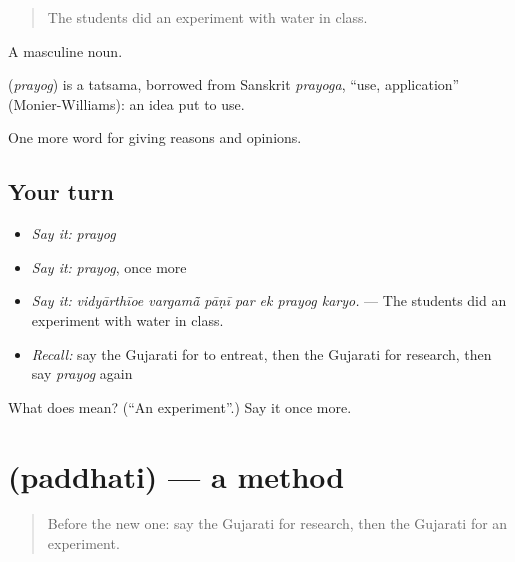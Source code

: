 \begin{quote}
The students did an experiment with water in class.
\end{quote}

A masculine noun.

\begin{cousinweb}
\textbf{} (\emph{prayog}) is a tatsama, borrowed from Sanskrit \emph{prayoga}, \textquotedblleft{}use, application\textquotedblright{} (Monier-Williams): an idea put to use.
\end{cousinweb}

\begin{grammarlens}[title={What you've built}]
One more word for giving reasons and opinions.
\end{grammarlens}

\subsection*{Your turn}
\begin{itemize}
\raggedright
  \item \emph{Say it:} \emph{prayog}
  \item \emph{Say it:} \emph{prayog}, once more
  \item \emph{Say it:} \emph{vidyārthīoe vargamā̃ pāṇī par ek prayog karyo.} — The students did an experiment with water in class.
  \item \emph{Recall:} say the Gujarati for to entreat, then the Gujarati for research, then say \emph{prayog} again
\end{itemize}

\begin{tcolorbox}[breakable,colback=teal!4,colframe=teal!35!black,title={Before you move on}]
What does  mean? (\textquotedblleft{}An experiment\textquotedblright{}.) Say it once more.
\end{tcolorbox}
\section[\texorpdfstring{\gu{પદ્ધતિ} (paddhati)}{પદ્ધતિ (paddhati)}]{ (paddhati) — a method}

\label{lesson:GU-C362-paddhati}



\begin{quote}
Before the new one: say the Gujarati for research, then the Gujarati for an experiment.
\end{quote}

